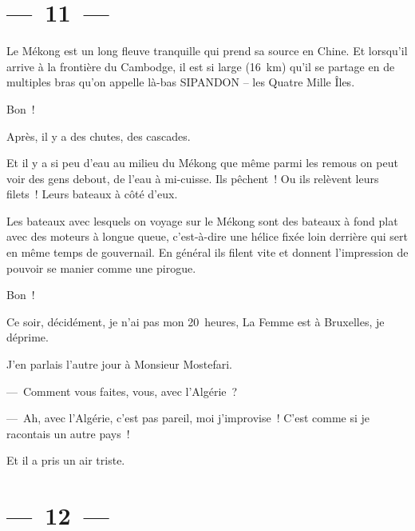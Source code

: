 \documentclass[twoside]{book} %
\begin{document}
\section[{— 11 —}]{— 11 —}
\renewcommand{\leftmark}{— 11 —}

\noindent Le Mékong est un long fleuve tranquille qui prend sa source en Chine. Et lorsqu’il arrive à la frontière du Cambodge, il est si large (16 km) qu’il se partage en de multiples bras qu’on appelle là-bas SIPANDON – les Quatre Mille Îles.\par
Bon !\par
Après, il y a des chutes, des cascades.\par
Et il y a si peu d’eau au milieu du Mékong que même parmi les remous on peut voir des gens debout, de l’eau à mi-cuisse. Ils pêchent ! Ou ils relèvent leurs filets ! Leurs bateaux à côté d’eux.\par
Les bateaux avec lesquels on voyage sur le Mékong sont des bateaux à fond plat avec des moteurs à longue queue, c’est-à-dire une hélice fixée loin derrière qui sert en même temps de gouvernail. En général ils filent vite et donnent l’impression de pouvoir se manier comme une pirogue.\par
Bon !\par
Ce soir, décidément, je n’ai pas mon 20 heures, La Femme est à Bruxelles, je déprime.\par
J’en parlais l’autre jour à Monsieur Mostefari.\par
— Comment vous faites, vous, avec l’Algérie ?\par
— Ah, avec l’Algérie, c’est pas pareil, moi j’improvise ! C’est comme si je racontais un autre pays !\par
Et il a pris un air triste.

\section[{— 12 —}]{— 12 —}
\renewcommand{\leftmark}{— 12 —}
\end{document}
